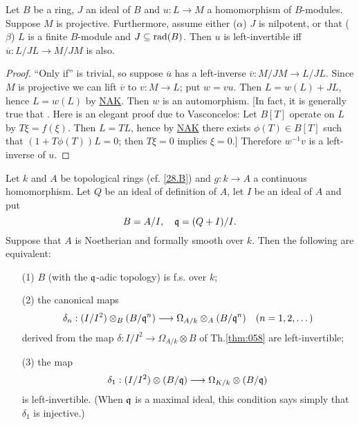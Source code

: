 \documentclass[../main]{subfiles}
\begin{document}
\begin{lemma}
\label{lem:29.2}
Let $B$ be a ring, $J$ an ideal of $B$ and $u : L \longrightarrow M$ a homomorphism of $B$-modules. Suppose $M$ is projective. Furthermore, assume either ($\alpha$) $J$ is nilpotent, or that ($\beta$) $L$ is a finite $B$-module and $J \subseteq \operatorname{rad}(B)$. Then $u$ is left-invertible iff $\overline u : L/JL \longrightarrow M/JM$ is also. 
\end{lemma}

\begin{proof}
``Only if'' is trivial, so suppose $\overline u$ has a left-inverse $\overline v : M/JM \longrightarrow L/JL$. Since $M$ is projective we can lift $\overline v$ to $v : M \longrightarrow L$; put $w = vu$. Then $L = w(L) + JL$, hence $L = w(L)$ by \hyperref[NAK]{NAK}. Then $w$ is an automorphism. [In fact, it is generally true that . Here is an elegant proof due to Vasconcelos: Let $B[T]$ operate on $L$ by $T \xi = f(\xi)$. Then $L = TL$, hence by \hyperref[NAK]{NAK} there exists $\phi(T) \in B[T]$ such that $(1 + T \phi(T))L = 0$; then $T \xi = 0$ implies $\xi = 0$.] Therefore $w^{-1}v$ is a left-inverse of $u$. 
\end{proof}

\begin{partheorem}
\label{thm:063}
Let $k$ and $A$ be topological rings (cf. \ref{28.B}) and $g : k \longrightarrow A$ a continuous homomorphism. Let $Q$ be an ideal of definition of $A$, let $I$ be an ideal of $A$ and put
\[
B = A/I, \quad \mathfrak{q} = (Q + I)/I.
\]
Suppose that $A$ is Noetherian and formally smooth over $k$. Then the following are equivalent: 

\begin{enumerate}
    \item[(1)] $B$ (with the $\mathfrak{q}$-adic topology) is f.s. over $k$;
    \item[(2)] the canonical maps \[\delta_n : (I/I^2) \otimes_B (B/{\mathfrak{q}}^n) \longrightarrow \Omega_{A/k} \otimes_A (B/{\mathfrak{q}}^n) \quad (n = 1, 2, \dots)\] derived from the map $\delta : I/I^2 \longrightarrow \Omega_{A/k} \otimes B$ of Th.\ref{thm:058} are left-invertible;
    \item[(3)] the map \[\delta_1 : (I/I^2) \otimes (B/\mathfrak{q}) \longrightarrow \Omega_{K/k} \otimes (B/\mathfrak{q})\] is left-invertible. (When $\mathfrak{q}$ is a maximal ideal, this condition says simply that $\delta_1$ is injective.) 
\end{enumerate}
\end{partheorem}
\end{document}

